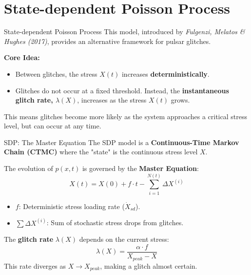 \section{State-dependent Poisson Process}

\begin{frame}{State-dependent Poisson Process} 
    This model, introduced by \textit{Fulgenzi, Melatos \& Hughes (2017)}, provides an alternative framework for pulsar glitches.

    \vspace{0.4cm}
    \textbf{Core Idea:}
    \begin{itemize}
        \item Between glitches, the stress $X(t)$ increases \textbf{deterministically}.
        \item Glitches do not occur at a fixed threshold. Instead, the \textbf{instantaneous glitch rate, $\lambda(X)$}, increases as the stress $X(t)$ grows.
    \end{itemize}

    \vspace{0.2cm}
    This means glitches become more likely as the system approaches a critical stress level, but can occur at any time.
\end{frame}

\begin{frame}{SDP: The Master Equation}
    The SDP model is a \textbf{Continuous-Time Markov Chain (CTMC)} where the "state" is the continuous stress level $X$.
    
    The evolution of $p(x, t)$ is governed by the \textbf{Master Equation}:
    \begin{equation}
    X(t) = X(0) + f \cdot t - \sum_{i=1}^{N(t)} \Delta X^{(i)}
    \end{equation}
    \vspace{-1em}
    \begin{itemize}
        \item $f$: Deterministic stress loading rate ($\dot{X}_{sd}$).
        \item $\sum \Delta X^{(i)}$: Sum of stochastic stress drops from glitches.
    \end{itemize}

    \vspace{0.2cm}

    The \textbf{glitch rate} $\lambda(X)$ depends on the current stress:
    \begin{equation}
    \lambda(X) = \frac{\alpha \cdot f}{X_{peak} - X}
    \end{equation}
    \vspace{-1em}
    This rate diverges as $X \to X_{peak}$, making a glitch almost certain.
\end{frame}

